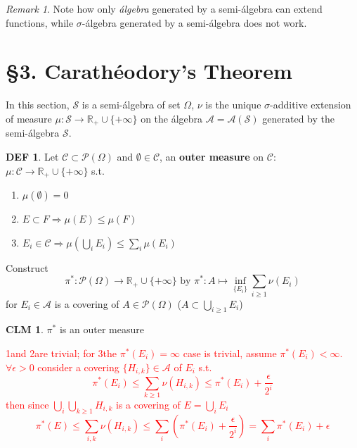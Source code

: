\documentclass[hidelinks]{article}
\theoremstyle{definition}
\newtheorem*{defin}{DEF}
\theoremstyle{dotless}
\newtheorem{claim}{CLM}[section]
\theoremstyle{remark}
\newtheorem*{remark}{Remark}
\begin{document}
\begin{remark}
Note how only \emph{álgebra} generated by a semi-álgebra can extend functions, while $\sigma$-álgebra generated by a semi-álgebra does not work.
\end{remark}

\bigbreak

\section*{\S3. Carathéodory's Theorem}
\setcounter{section}{3}

In this section, $\mathscr{S}$ is a semi-álgebra of set $\Omega$, $\nu$ is the unique $\sigma$-additive extension of measure $\mu:\mathscr{S}\to\mathbb{R}_+\cup\{+\infty\}$ on the álgebra $\mathscr{A}=\mathscr{A}(\mathscr{S})$ generated by the semi-álgebra $\mathscr{S}$.

\begin{defin}
Let $\mathscr{C}\subset\mathscr{P}(\Omega)$ and $\emptyset\in\mathscr{C}$, an \textbf{outer measure} on $\mathscr{C}$: $\mu:\mathscr{C}\to\mathbb{R}_+\cup\{+\infty\}$ s.t.\begin{enumerate}[label=\arabic*\degree]
    \item $\mu(\emptyset)=0$
    \item $E\subset F\Rightarrow\mu(E)\leq\mu(F)$
    \item $E_i\in\mathscr{C}\Rightarrow\mu(\bigcup\limits_iE_i)\leq\sum\limits_i\mu(E_i)$
\end{enumerate}
\end{defin}

Construct
\[\pi^*:\mathscr{P}(\Omega)\to\mathbb{R}_+\cup\{+\infty\}\textrm{ by }\pi^*:A\mapsto\inf\limits_{\{E_i\}}\sum\limits_{i\geq1}\nu(E_i)\]
for ${E_i}\in\mathscr{A}$ is a covering of $A\in\mathscr{P}(\Omega)$ ($A\subset\bigcup\limits_{i\geq1}E_i$)

\begin{claim}\label{CLM 3.5}
$\pi^*$ is an outer measure
\end{claim}
\textcolor{red}{1\degree and 2\degree are trivial; for 3\degree the $\pi^*(E_i)=\infty$ case is trivial, assume $\pi^*(E_i)<\infty$. $\forall\epsilon>0$ consider a covering $\{H_{i,k}\}\in\mathscr{A}$ of $E_i$ s.t.
\[\pi^*(E_i)\leq\sum_{k\geq1}\nu(H_{i,k})\leq\pi^*(E_i)+\frac{\epsilon}{2^i}\]
then since $\bigcup\limits_i\bigcup\limits_{k\geq1}H_{i,k}$ is a covering of $E=\bigcup\limits_iE_i$
\[\pi^*(E)\leq\sum\limits_{i,k}\nu(H_{i,k})\leq\sum\limits_i(\pi^*(E_i)+\frac{\epsilon}{2^i})=\sum\limits_i\pi^*(E_i)+\epsilon\]}
\end{document}
